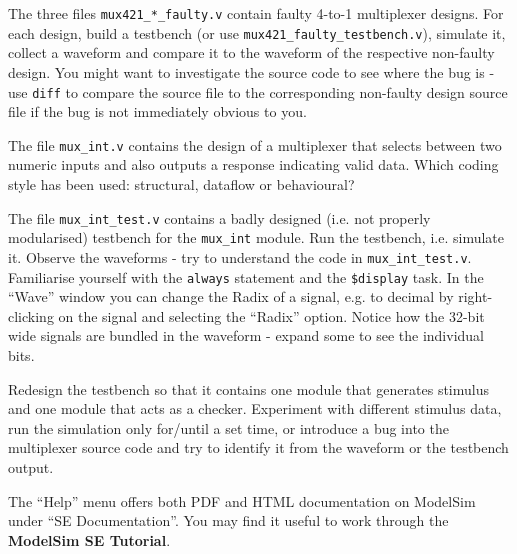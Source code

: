 \documentclass[a4paper,11pt]{article}
\begin{document}
\smallskip

The three files \verb#mux421_*_faulty.v# contain faulty 4-to-1 multiplexer
designs.  For each design, build a testbench (or use
\verb#mux421_faulty_testbench.v#), simulate it, collect a waveform and compare
it to the waveform of the respective non-faulty design. You might want to
investigate the source code to see where the bug is - use \verb#diff# to
compare the source file to the corresponding non-faulty design source file if
the bug is not immediately obvious to you.

\smallskip
{}
\smallskip

The file \verb#mux_int.v# contains the design of a multiplexer that selects
between two numeric inputs and also outputs a response indicating valid data.
Which coding style has been used: structural, dataflow or behavioural?

The file \verb#mux_int_test.v# contains a badly designed (i.e. not properly
modularised) testbench for the \verb#mux_int# module. Run the testbench, i.e.
simulate it. Observe the waveforms - try to understand the code in
\verb#mux_int_test.v#. Familiarise yourself with the \verb#always# statement
and the \verb#$display# task. In the ``Wave'' window you can change the
Radix of a signal, e.g. to decimal by right-clicking on the signal and
selecting the ``Radix'' option. Notice how the 32-bit wide signals are bundled
in the waveform - expand some to see the individual bits.

Redesign the testbench so that it contains one module that generates stimulus
and one module that acts as a checker. Experiment with different stimulus data,
run the simulation only for/until a set time, or introduce a bug into the
multiplexer source code and try to identify it from the waveform or the
testbench output.

\smallskip
{}
\smallskip

The ``Help'' menu offers both PDF and HTML documentation on ModelSim under ``SE
Documentation''. You may find it useful to work through the {\bf ModelSim SE Tutorial}.

\end{document}
